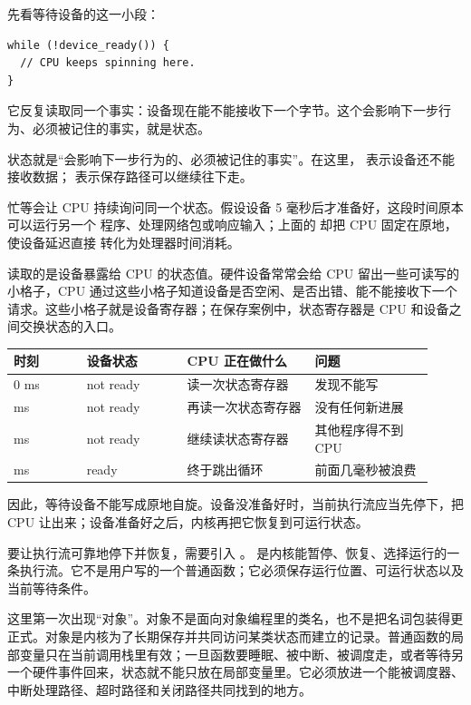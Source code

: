 先看等待设备的这一小段：

\begin{lstlisting}
while (!device_ready()) {
  // CPU keeps spinning here.
}
\end{lstlisting}

它反复读取同一个事实：设备现在能不能接收下一个字节。这个会影响下一步行为、必须被记住的事实，就是状态。

\begin{keyidea}
状态就是“会影响下一步行为的、必须被记住的事实”。在这里， 表示设备还不能接收数据； 表示保存路径可以继续往下走。
\end{keyidea}

忙等会让 CPU 持续询问同一个状态。假设设备 5 毫秒后才准备好，这段时间原本可以运行另一个
程序、处理网络包或响应输入；上面的  却把 CPU 固定在原地，使设备延迟直接
转化为处理器时间消耗。

 读取的是设备暴露给 CPU 的状态值。硬件设备常常会给 CPU 留出一些可读写的小格子，CPU 通过这些小格子知道设备是否空闲、是否出错、能不能接收下一个请求。这些小格子就是设备寄存器；在保存案例中，状态寄存器是 CPU 和设备之间交换状态的入口。

\begin{longtable}{|L{0.16\linewidth}|L{0.22\linewidth}|L{0.28\linewidth}|L{0.26\linewidth}|}
\toprule
时刻 & 设备状态 & CPU 正在做什么 & 问题 \\
 ms & not ready & 读一次状态寄存器 & 发现不能写 \\ ms & not ready & 再读一次状态寄存器 & 没有任何新进展 \\ ms & not ready & 继续读状态寄存器 & 其他程序得不到 CPU \\ ms & ready & 终于跳出循环 & 前面几毫秒被浪费 \\
\bottomrule
\end{longtable}

因此，等待设备不能写成原地自旋。设备没准备好时，当前执行流应当先停下，把 CPU 让出来；设备准备好之后，内核再把它恢复到可运行状态。

要让执行流可靠地停下并恢复，需要引入 。 是内核能暂停、恢复、选择运行的一条执行流。它不是用户写的一个普通函数；它必须保存运行位置、可运行状态以及当前等待条件。

这里第一次出现“对象”。对象不是面向对象编程里的类名，也不是把名词包装得更正式。对象是内核为了长期保存并共同访问某类状态而建立的记录。普通函数的局部变量只在当前调用栈里有效；一旦函数要睡眠、被中断、被调度走，或者等待另一个硬件事件回来，状态就不能只放在局部变量里。它必须放进一个能被调度器、中断处理路径、超时路径和关闭路径共同找到的地方。

